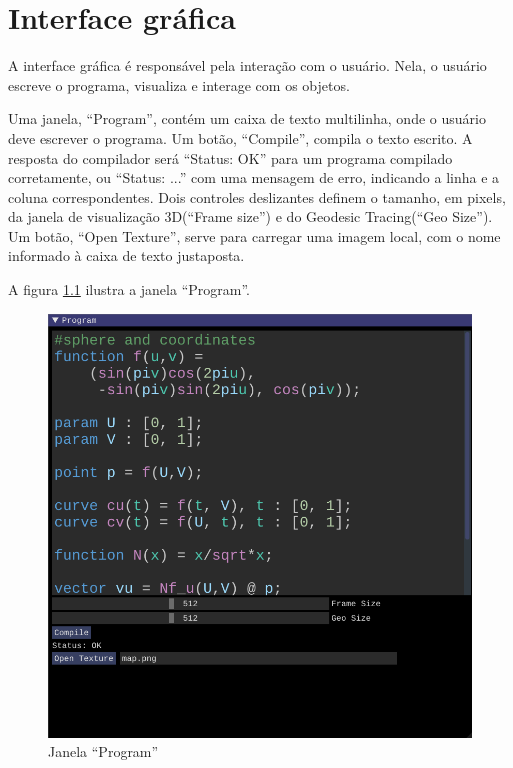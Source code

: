 \chapter{Interface gráfica}
\label{interface}

A interface gráfica é responsável pela interação com o usuário.
Nela, o usuário escreve o programa, visualiza e interage com os objetos.

Uma janela, ``Program'', contém um caixa de texto multilinha, onde
o usuário deve escrever o programa.
Um botão, ``Compile'', compila o texto escrito.
A resposta do compilador será ``Status: OK'' para um programa compilado 
corretamente, ou ``Status: ...'' com uma mensagem de erro, indicando a
linha e a coluna correspondentes.
Dois controles deslizantes definem o tamanho, em pixels, da janela
de visualização 3D(``Frame size'') e do Geodesic Tracing(``Geo Size'').
Um botão, ``Open Texture'', serve para carregar uma imagem local,
com o nome informado à caixa de texto justaposta.

A figura \ref{img:program} ilustra a janela ``Program''.

\begin{figure}[!ht]
    \includegraphics[width=\linewidth]{program.png}
    \caption{Janela ``Program''}
    \label{img:program}
\end{figure}

